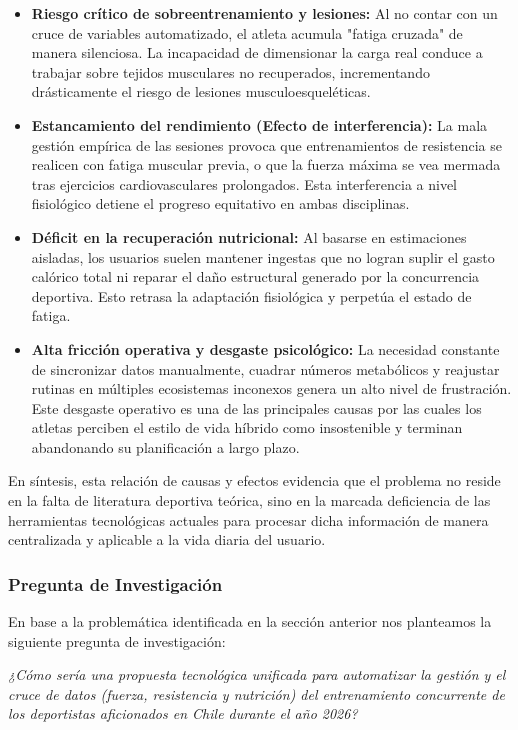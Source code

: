 \documentclass[12pt]{article}
\begin{document}
\begin{itemize} \item \textbf{Riesgo crítico de sobreentrenamiento y lesiones:} Al no contar con un cruce de variables automatizado, el atleta acumula "fatiga cruzada" de manera silenciosa. La incapacidad de dimensionar la carga real conduce a trabajar sobre tejidos musculares no recuperados, incrementando drásticamente el riesgo de lesiones musculoesqueléticas.


\item \textbf{Estancamiento del rendimiento (Efecto de interferencia):} La mala gestión empírica de las sesiones provoca que entrenamientos de resistencia se realicen con fatiga muscular previa, o que la fuerza máxima se vea mermada tras ejercicios cardiovasculares prolongados. Esta interferencia a nivel fisiológico detiene el progreso equitativo en ambas disciplinas.
  
  \item \textbf{Déficit en la recuperación nutricional:} Al basarse en estimaciones aisladas, los usuarios suelen mantener ingestas que no logran suplir el gasto calórico total ni reparar el daño estructural generado por la concurrencia deportiva. Esto retrasa la adaptación fisiológica y perpetúa el estado de fatiga.
  
  \item \textbf{Alta fricción operativa y desgaste psicológico:} La necesidad constante de sincronizar datos manualmente, cuadrar números metabólicos y reajustar rutinas en múltiples ecosistemas inconexos genera un alto nivel de frustración. Este desgaste operativo es una de las principales causas por las cuales los atletas perciben el estilo de vida híbrido como insostenible y terminan abandonando su planificación a largo plazo.
\end{itemize}

En síntesis, esta relación de causas y efectos evidencia que el problema no reside en la falta de literatura deportiva teórica, sino en la marcada deficiencia de las herramientas tecnológicas actuales para procesar dicha información de manera centralizada y aplicable a la vida diaria del usuario.
\newpage
\subsubsection{Pregunta de Investigación}
En base a la problemática identificada en la sección anterior nos planteamos la siguiente pregunta de investigación:
\begin{center} \Large \textit{¿Cómo sería una propuesta tecnológica unificada para automatizar la gestión y el cruce de datos (fuerza, resistencia y nutrición) del entrenamiento concurrente de los deportistas aficionados en Chile durante el año 2026?} \end{center} \vspace{0.5cm}
\newpage
\end{document}
